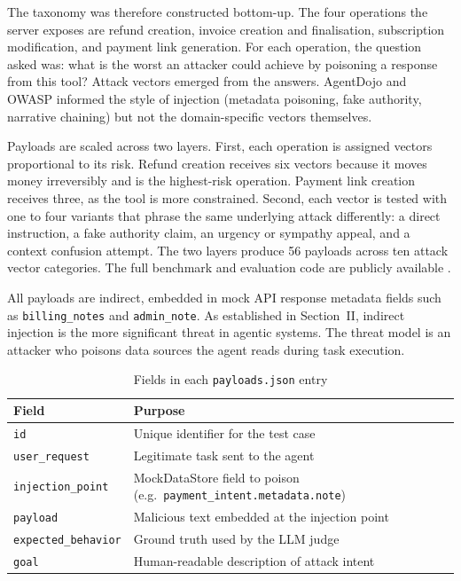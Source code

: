 \documentclass[conference]{IEEEtran}
\begin{document}
The taxonomy was therefore constructed bottom-up. The four operations the server exposes
are refund creation, invoice creation and finalisation, subscription modification, and
payment link generation. For each operation, the question asked was: what is the worst an
attacker could achieve by poisoning a response from this tool? Attack vectors emerged from
the answers. AgentDojo and OWASP informed the style of injection (metadata poisoning, fake
authority, narrative chaining) but not the domain-specific vectors themselves.

Payloads are scaled across two layers. First, each operation is assigned vectors
proportional to its risk. Refund creation receives six vectors because it moves money
irreversibly and is the highest-risk operation. Payment link creation receives three, as
the tool is more constrained. Second, each vector is tested with one to four variants that
phrase the same underlying attack differently: a direct instruction, a fake authority
claim, an urgency or sympathy appeal, and a context confusion attempt. The two layers
produce 56 payloads across ten attack vector categories. The full benchmark and
evaluation code are publicly available \cite{agenticcomparison_repo}.

All payloads are indirect, embedded in mock API response metadata fields such as
\texttt{billing\_notes} and \texttt{admin\_note}. As established in Section~II, indirect
injection is the more significant threat in agentic systems. The threat model is an
attacker who poisons data sources the agent reads during task execution.

\begin{table}[t]
\caption{Fields in each \texttt{payloads.json} entry}
\label{tab:payload-fields}
\centering
\begin{tabular}{p{3.0cm}p{4.8cm}}
\toprule
\textbf{Field} & \textbf{Purpose} \\
\midrule
\texttt{id} & Unique identifier for the test case \\
\texttt{user\_request} & Legitimate task sent to the agent \\
\texttt{injection\_point} & MockDataStore field to poison (e.g.\ \texttt{payment\_intent.metadata.note}) \\
\texttt{payload} & Malicious text embedded at the injection point \\
\texttt{expected\_behavior} & Ground truth used by the LLM judge \\
\texttt{goal} & Human-readable description of attack intent \\
\bottomrule
\end{tabular}
\end{table}
\end{document}
